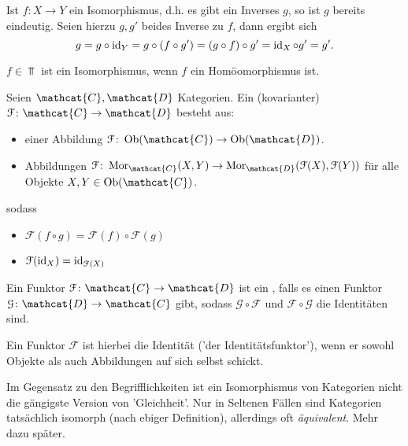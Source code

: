 \begin{recap}
    Ist $f\colon X\to Y$ ein Isomorphismus, d.h. es gibt ein Inverses  $g$, so ist  $g$ bereits eindeutig. Seien hierzu  $g,g'$ beides Inverse zu  $f$, dann ergibt sich
    \[
        g = g \circ  \operatorname{id}_{Y} = g \circ  (f \circ  g') = (g \circ  f) \circ  g' = \operatorname{id}_{X} \circ  g' = g' 
    .\] 
\end{recap}

\begin{example}
    $f\in  \Top$ ist ein Isomorphismus, wenn $f$ ein Homöomorphismus ist.
\end{example}

\begin{definition}[Funktor]\label{def:funktor}
    Seien $\mathcat{C},\mathcat{D}$ Kategorien. Ein (kovarianter)  $\mathcal{F} \colon \mathcat{C} \to  \mathcat{D}$ besteht aus:
    \begin{itemize}
        \item einer Abbildung $\mathcal{F} \colon \Ob(\mathcat{C}) \to  \Ob(\mathcat{D})$.
        \item Abbildungen $\mathcal{F}\colon \Mor_{\mathcat{C}}(X,Y) \to  \Mor_{\mathcat{D}}(\mathcal{F}(X),\mathcal{F}(Y))$ für alle Objekte $X,Y\in \Ob(\mathcat{C})$.
    \end{itemize}
    sodass
    \begin{itemize}
        \item $\mathcal{F}(f \circ  g) = \mathcal{F}(f) \circ \mathcal{F}(g)$ 
        \item $\mathcal{F}(\operatorname{id}_X) = \operatorname{id}_{\mathcal{F}(X)}$
    \end{itemize}
\end{definition}

\begin{definition}\label{def:funktor-isomorphismus}
    Ein Funktor $\mathcal{F} \colon \mathcat{C} \to  \mathcat{D}$ ist ein , falls es einen Funktor $\mathcal{G} \colon \mathcat{D} \to  \mathcat{C}$ gibt, sodass $\mathcal{G} \circ  \mathcal{F}$ und $\mathcal{F} \circ  \mathcal{G}$ die Identitäten sind.
\end{definition}
\begin{oral}
    Ein Funktor $\mathcal{F}$ ist hierbei die Identität ('der Identitätsfunktor'), wenn er sowohl Objekte als auch Abbildungen auf sich selbst schickt.
\end{oral}

\begin{doral}
    Im Gegensatz zu den Begrifflichkeiten ist ein Isomorphismus von Kategorien nicht die gängigste Version von 'Gleichheit'. Nur in Seltenen Fällen sind Kategorien tatsächlich isomorph (nach ebiger Definition), allerdings oft \textit{äquivalent}. Mehr dazu später.
\end{doral}

